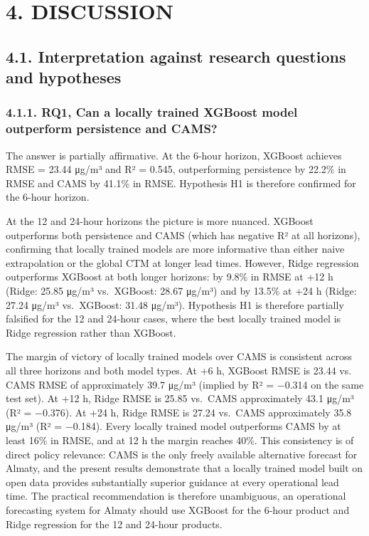 \section{4. DISCUSSION}\label{discussion}

\subsection{4.1. Interpretation against research questions and hypotheses}\label{interpretation-against-research-questions-and-hypotheses}

\subsubsection{4.1.1. RQ1, Can a locally trained XGBoost model outperform persistence and CAMS?}\label{rq1-can-a-locally-trained-xgboost-model-outperform-persistence-and-cams}

The answer is partially affirmative. At the 6-hour horizon, XGBoost achieves RMSE = 23.44 μg/m³ and R² = 0.545, outperforming persistence by 22.2\% in RMSE and CAMS by 41.1\% in RMSE. Hypothesis H1 is therefore confirmed for the 6-hour horizon.

At the 12 and 24-hour horizons the picture is more nuanced. XGBoost outperforms both persistence and CAMS (which has negative R² at all horizons), confirming that locally trained models are more informative than either naive extrapolation or the global CTM at longer lead times. However, Ridge regression outperforms XGBoost at both longer horizons: by 9.8\% in RMSE at +12 h (Ridge: 25.85 μg/m³ vs.~XGBoost: 28.67 μg/m³) and by 13.5\% at +24 h (Ridge: 27.24 μg/m³ vs.~XGBoost: 31.48 μg/m³). Hypothesis H1 is therefore partially falsified for the 12 and 24-hour cases, where the best locally trained model is Ridge regression rather than XGBoost.

The margin of victory of locally trained models over CAMS is consistent across all three horizons and both model types. At +6 h, XGBoost RMSE is 23.44 vs. CAMS RMSE of approximately 39.7 μg/m³ (implied by R² = −0.314 on the same test set). At +12 h, Ridge RMSE is 25.85 vs.~CAMS approximately 43.1 μg/m³ (R² = −0.376). At +24 h, Ridge RMSE is 27.24 vs.~CAMS approximately 35.8 μg/m³ (R² = −0.184). Every locally trained model outperforms CAMS by at least 16\% in RMSE, and at 12 h the margin reaches 40\%. This consistency is of direct policy relevance: CAMS is the only freely available alternative forecast for Almaty, and the present results demonstrate that a locally trained model built on open data provides substantially superior guidance at every operational lead time. The practical recommendation is therefore unambiguous, an operational forecasting system for Almaty should use XGBoost for the 6-hour product and Ridge regression for the 12 and 24-hour products.

